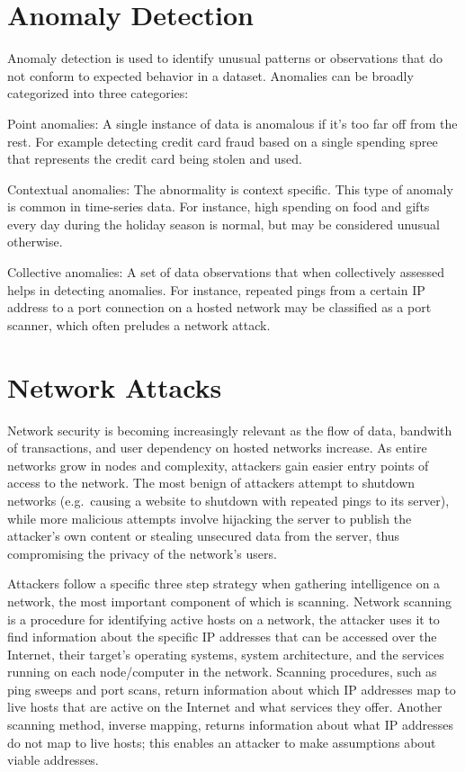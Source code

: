 \documentclass[12pt,twoside]{dukestatscithesis}
\theoremstyle{definition}
\theoremstyle{definition}
\theoremstyle{definition}
\theoremstyle{remark}
\begin{document}
\section{Anomaly Detection}\label{anomaly-detection}

Anomaly detection is used to identify unusual patterns or observations
that do not conform to expected behavior in a dataset. Anomalies can be
broadly categorized into three categories:

Point anomalies: A single instance of data is anomalous if it's too far
off from the rest. For example detecting credit card fraud based on a
single spending spree that represents the credit card being stolen and
used.

Contextual anomalies: The abnormality is context specific. This type of
anomaly is common in time-series data. For instance, high spending on
food and gifts every day during the holiday season is normal, but may be
considered unusual otherwise.

Collective anomalies: A set of data observations that when collectively
assessed helps in detecting anomalies. For instance, repeated pings from
a certain IP address to a port connection on a hosted network may be
classified as a port scanner, which often preludes a network attack.

\section{Network Attacks}\label{network-attacks}

Network security is becoming increasingly relevant as the flow of data,
bandwith of transactions, and user dependency on hosted networks
increase. As entire networks grow in nodes and complexity, attackers
gain easier entry points of access to the network. The most benign of
attackers attempt to shutdown networks (e.g.~causing a website to
shutdown with repeated pings to its server), while more malicious
attempts involve hijacking the server to publish the attacker's own
content or stealing unsecured data from the server, thus compromising
the privacy of the network's users.

Attackers follow a specific three step strategy when gathering
intelligence on a network, the most important component of which is
scanning. Network scanning is a procedure for identifying active hosts
on a network, the attacker uses it to find information about the
specific IP addresses that can be accessed over the Internet, their
target's operating systems, system architecture, and the services
running on each node/computer in the network. Scanning procedures, such
as ping sweeps and port scans, return information about which IP
addresses map to live hosts that are active on the Internet and what
services they offer. Another scanning method, inverse mapping, returns
information about what IP addresses do not map to live hosts; this
enables an attacker to make assumptions about viable addresses.
\end{document}
